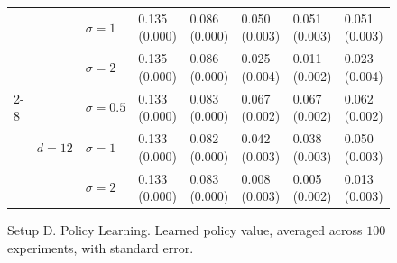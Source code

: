 \documentclass[11pt]{article} %
\theoremstyle{theorem}  %
\theoremstyle{plain}
\begin{document}
\begin{figure}[H]
\begin{tabular}{llllllll}
         &        & $\sigma=1$ &  0.135 (0.000) &  0.086 (0.000) &  0.050 (0.003) &   0.051 (0.003) &  0.051 (0.003) \\
         &        & $\sigma=2$ &  0.135 (0.000) &  0.086 (0.000) &  0.025 (0.004) &   0.011 (0.002) &  0.023 (0.004) \\
\cline{2-8}
         & \multirow{3}{*}{$d=12$} & $\sigma=0.5$ &  0.133 (0.000) &  0.083 (0.000) &  0.067 (0.002) &   0.067 (0.002) &  0.062 (0.002) \\
         &        & $\sigma=1$ &  0.133 (0.000) &  0.082 (0.000) &  0.042 (0.003) &   0.038 (0.003) &  0.050 (0.003) \\
         &        & $\sigma=2$ &  0.133 (0.000) &  0.083 (0.000) &  0.008 (0.003) &   0.005 (0.002) &  0.013 (0.003) \\
\bottomrule
\end{tabular}

\caption{Setup D. Policy Learning. Learned policy value, averaged across $100$ experiments, with standard error.}
\label{fig:setupD-policy}
\end{figure}
 
\end{document}
